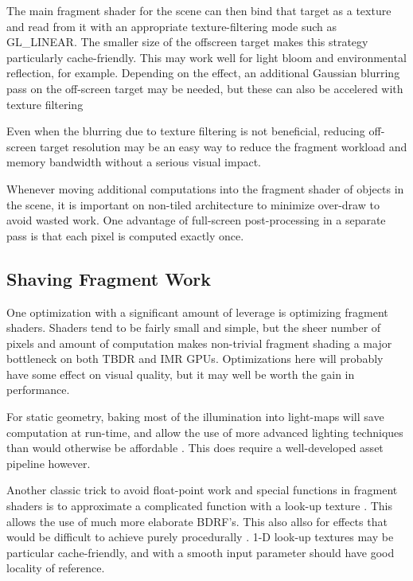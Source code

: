 The main fragment shader for the scene can then bind that target as a texture
and read from it with an appropriate texture-filtering mode such as GL\_LINEAR.
The smaller size of the offscreen target makes this strategy particularly
cache-friendly.  This may work well for light bloom and environmental
reflection, for example.  Depending on the effect, an additional Gaussian
blurring pass on the off-screen target may be needed, but these can also be
accelered with texture filtering \cite{bloom}

Even when the blurring due to texture filtering is not beneficial, reducing
off-screen target resolution may be an easy way to reduce the fragment workload
and memory bandwidth without a serious visual impact.

Whenever moving additional computations into the fragment shader of objects in
the scene, it is important on non-tiled architecture to minimize over-draw to
avoid wasted work.  One advantage of full-screen post-processing in a separate
pass is that each pixel is computed exactly once.

\subsection{Shaving Fragment Work}\label{Jon-McCaffrey-Shaving-Fragment-Work}

One optimization with a significant amount of leverage is optimizing fragment shaders.  Shaders tend to be fairly small and simple, but the sheer number of pixels and amount of computation makes non-trivial fragment shading a major bottleneck on both TBDR and IMR GPUs.  Optimizations here will probably have some effect on visual quality, but it may well be worth the gain in performance.

For static geometry, baking most of the illumination into light-maps will save computation at run-time, and allow the use of more advanced lighting techniques than would otherwise be affordable \cite{lightmaps} \cite{unity_graphics_perf}.  This does require a well-developed asset pipeline however.

Another classic trick to avoid float-point work and special functions in fragment shaders is to approximate a complicated function with a look-up texture \cite{ios_shader_tricks}.  This allows the use of much more elaborate BDRF's.  This also allso for effects that would be difficult to achieve purely procedurally \cite{illustrative}.  1-D look-up textures may be particular cache-friendly, and with a smooth input parameter should have good locality of reference.  

